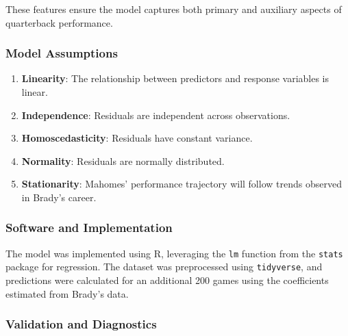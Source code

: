 \documentclass[
  letterpaper,
  DIV=11,
  numbers=noendperiod]{scrartcl}
\providecommand{\tightlist}{%
  \setlength{\itemsep}{0pt}\setlength{\parskip}{0pt}}\usepackage{longtable,booktabs,array}
\begin{document}
These features ensure the model captures both primary and auxiliary
aspects of quarterback performance.

\subsubsection{Model Assumptions}\label{model-assumptions}

\begin{enumerate}
\def\labelenumi{\arabic{enumi}.}
\tightlist
\item
  \textbf{Linearity}: The relationship between predictors and response
  variables is linear.\\
\item
  \textbf{Independence}: Residuals are independent across
  observations.\\
\item
  \textbf{Homoscedasticity}: Residuals have constant variance.\\
\item
  \textbf{Normality}: Residuals are normally distributed.\\
\item
  \textbf{Stationarity}: Mahomes' performance trajectory will follow
  trends observed in Brady's career.
\end{enumerate}

\subsubsection{Software and
Implementation}\label{software-and-implementation}

The model was implemented using R, leveraging the \texttt{lm} function
from the \texttt{stats} package for regression. The dataset was
preprocessed using \texttt{tidyverse}, and predictions were calculated
for an additional 200 games using the coefficients estimated from
Brady's data.

\subsubsection{Validation and
Diagnostics}\label{validation-and-diagnostics}
\end{document}
